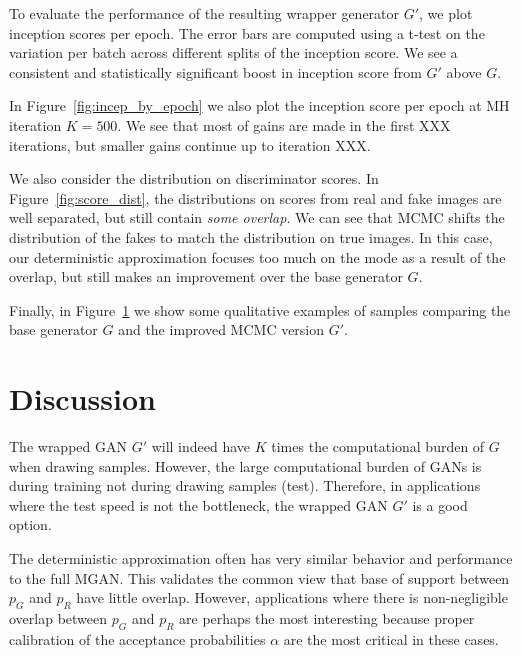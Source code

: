 \documentclass{article}
\newcommand{\PG}{{p_G}}
\newcommand{\PR}{{p_R}}
\newcommand{\accept}{\alpha}
\begin{document}
To evaluate the performance of the resulting wrapper generator $G'$, we plot inception scores per epoch.
The error bars are computed using a t-test on the variation per batch across different splits of the inception score.
We see a consistent and statistically significant boost in inception score from $G'$ above $G$.

In Figure~\ref{fig:incep_by_epoch} we also plot the inception score per epoch at MH iteration $K=500$.
We see that most of gains are made in the first XXX iterations, but smaller gains continue up to iteration XXX.  %

We also consider the distribution on discriminator scores.
In Figure~\ref{fig:score_dist}, the distributions on scores from real and fake images are well separated, but still contain \emph{some overlap}.
We can see that MCMC shifts the distribution of the fakes to match the distribution on true images.
In this case, our deterministic approximation focuses too much on the mode as a result of the overlap, but still makes an improvement over the base generator $G$.

Finally, in Figure~\ref{} we show some qualitative examples of samples comparing the base generator $G$ and the improved MCMC version $G'$.

\section{Discussion}

The wrapped GAN $G'$ will indeed have $K$ times the computational burden of $G$ when drawing samples.
However, the large computational burden of GANs is during training not during drawing samples (test)\@.
Therefore, in applications where the test speed is not the bottleneck, the wrapped GAN $G'$ is a good option.

The deterministic approximation often has very similar behavior and performance to the full MGAN\@.
This validates the common view that base of support between $\PG$ and $\PR$ have little overlap.
However, applications where there is non-negligible overlap between $\PG$ and $\PR$ are perhaps the most interesting because proper calibration of the acceptance probabilities $\accept$ are the most critical in these cases.
\end{document}
